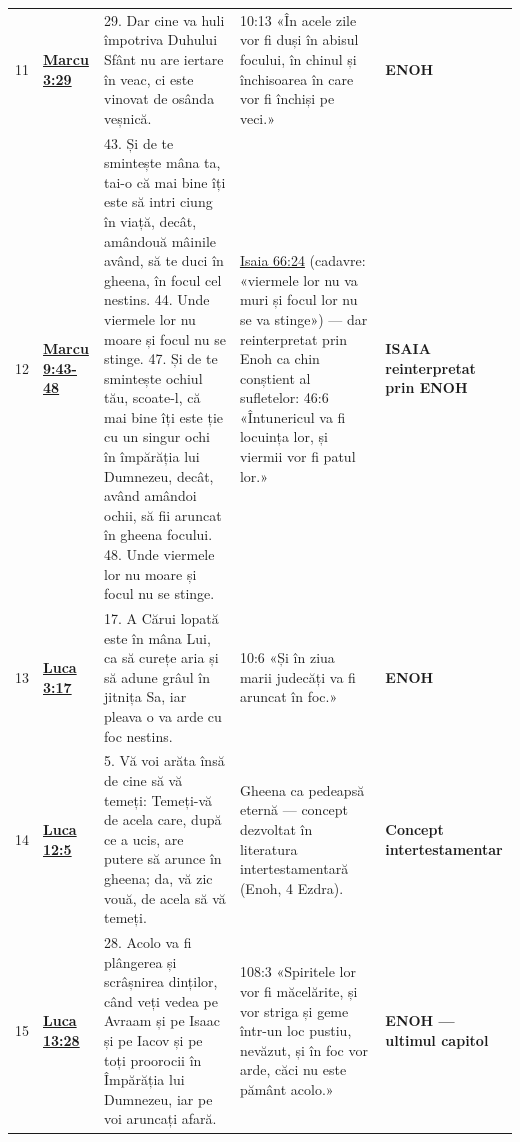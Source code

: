 \documentclass[12pt,a4paper,twoside,openany]{book}
\begin{document}
\begin{longtable}{L{0.7cm}L{0.7cm}L{5.2cm}L{7.1cm}L{0.7cm}}
11 & \href{https://bibliaortodoxa.ro/carte.php?id=53\&cap=3\#29}{\textbf{Marcu 3:29}} & 29. Dar cine va huli împotriva Duhului Sfânt nu are iertare în veac, ci este vinovat de osânda veșnică. & 10:13 «În acele zile vor fi duși în abisul focului, în chinul și închisoarea în care vor fi închiși pe veci.» & \textbf{ENOH} \\
12 & \href{https://bibliaortodoxa.ro/carte.php?id=53\&cap=9\#43}{\textbf{Marcu 9:43-48}} & 43. Și de te smintește mâna ta, tai-o că mai bine îți este să intri ciung în viață, decât, amândouă mâinile având, să te duci în gheena, în focul cel nestins. 44. Unde viermele lor nu moare și focul nu se stinge. 47. Și de te smintește ochiul tău, scoate-l, că mai bine îți este ție cu un singur ochi în împărăția lui Dumnezeu, decât, având amândoi ochii, să fii aruncat în gheena focului. 48. Unde viermele lor nu moare și focul nu se stinge. & \href{https://bibliaortodoxa.ro/carte.php?id=43\&cap=66\#24}{Isaia 66:24} (cadavre: «viermele lor nu va muri și focul lor nu se va stinge») — dar reinterpretat prin Enoh ca chin conștient al sufletelor: 46:6 «Întunericul va fi locuința lor, și viermii vor fi patul lor.» & \textbf{ISAIA reinterpretat prin ENOH} \\
13 & \href{https://bibliaortodoxa.ro/carte.php?id=48\&cap=3\#17}{\textbf{Luca 3:17}} & 17. A Cărui lopată este în mâna Lui, ca să curețe aria și să adune grâul în jitnița Sa, iar pleava o va arde cu foc nestins. & 10:6 «Și în ziua marii judecăți va fi aruncat în foc.» & \textbf{ENOH} \\
14 & \href{https://bibliaortodoxa.ro/carte.php?id=48\&cap=12\#5}{\textbf{Luca 12:5}} & 5. Vă voi arăta însă de cine să vă temeți: Temeți-vă de acela care, după ce a ucis, are putere să arunce în gheena; da, vă zic vouă, de acela să vă temeți. & Gheena ca pedeapsă eternă — concept dezvoltat în literatura intertestamentară (Enoh, 4 Ezdra). & \textbf{Concept intertestamentar} \\
15 & \href{https://bibliaortodoxa.ro/carte.php?id=48\&cap=13\#28}{\textbf{Luca 13:28}} & 28. Acolo va fi plângerea și scrâșnirea dinților, când veți vedea pe Avraam și pe Isaac și pe Iacov și pe toți proorocii în Împărăția lui Dumnezeu, iar pe voi aruncați afară. & 108:3 «Spiritele lor vor fi măcelărite, și vor striga și geme într-un loc pustiu, nevăzut, și în foc vor arde, căci nu este pământ acolo.» & \textbf{ENOH — ultimul capitol} \\

\end{longtable}
\end{document}
